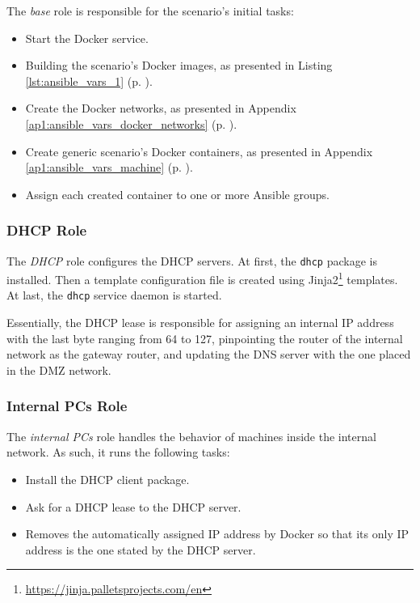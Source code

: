The \textit{base} role is responsible for the scenario's initial tasks:

\begin{itemize}
    \item Start the Docker service.
    \item Building the scenario's Docker images, as presented in Listing \ref{lst:ansible_vars_1} (p. \pageref{lst:ansible_vars_1}).
    \item Create the Docker networks, as presented in Appendix \ref{ap1:ansible_vars_docker_networks} (p. \pageref{ap1:ansible_vars_docker_networks}).
    \item Create generic scenario's Docker containers, as presented in Appendix \ref{ap1:ansible_vars_machine} (p. \pageref{ap1:ansible_vars_machine}).
    \item Assign each created container to one or more Ansible groups.
\end{itemize}

\subsubsection{DHCP Role} \label{sec:ansible_dhcp_role}

The \textit{DHCP} role configures the DHCP servers. At first, the \texttt{dhcp} package is installed. Then a template configuration file is created using Jinja2\footnote{\url{https://jinja.palletsprojects.com/en}} templates. At last, the \texttt{dhcp} service daemon is started.

Essentially, the DHCP lease is responsible for assigning an internal IP address with the last byte ranging from 64 to 127, pinpointing the router of the internal network as the gateway router, and updating the DNS server with the one placed in the DMZ network.

\subsubsection{Internal PCs Role} \label{sec:ansible_internal_pcs_role}

The \textit{internal PCs} role handles the behavior of machines inside the internal network. As such, it runs the following tasks:

\begin{itemize}
    \item Install the DHCP client package.
    \item Ask for a DHCP lease to the DHCP server.
    \item Removes the automatically assigned IP address by Docker so that its only IP address is the one stated by the DHCP server.
\end{itemize}

